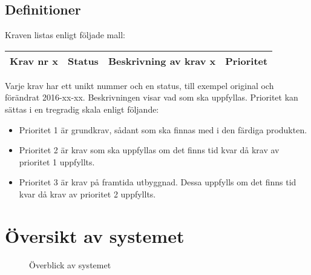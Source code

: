 \documentclass[11pt]{article}
\begin{document}
\begin{flushleft}
\subsection{Definitioner}
Kraven listas enligt följade mall:

\begin{center}
\begin{longtable}{|l|l|p{.65\linewidth}|l|} \hline
Krav nr x & 
Status &
Beskrivning av krav x &
Prioritet \\ \hline
\end{longtable}
\end{center}

Varje krav har ett unikt nummer och en status, till exempel original och förändrat 2016-xx-xx. Beskrivningen visar vad som ska uppfyllas. Prioritet kan sättas i en tregradig skala enligt följande:


\pagebreak
\begin{itemize}
  \item Prioritet 1 är grundkrav, sådant som ska finnas med i den färdiga produkten.
  \item Prioritet 2 är krav som ska uppfyllas om det finns tid kvar då krav av prioritet 1 uppfyllts.
  \item Prioritet 3 är krav på framtida utbyggnad. Dessa uppfylls om det finns tid kvar då krav av prioritet 2 uppfyllts.
\end{itemize}


\pagebreak
\section{Översikt av systemet}

\begin{figure}[htbp]
\centering
{}
\caption{Överblick av systemet}
\end{figure}


\end{flushleft}
\end{document}
